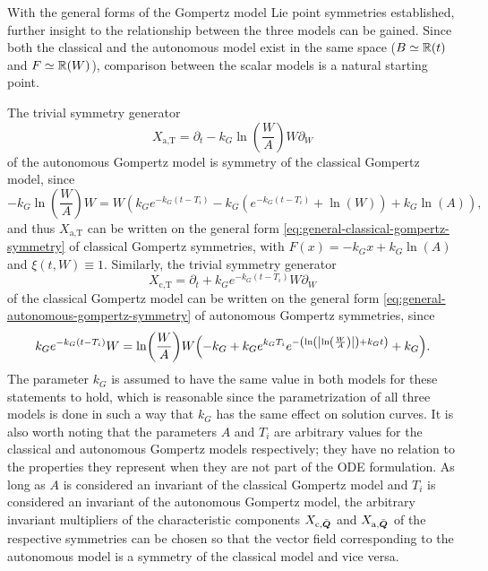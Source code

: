 With the general forms of the Gompertz model Lie point symmetries established, further insight to the relationship between the three models can be gained.
Since both the classical and the autonomous model exist in the same space (\(B \simeq \mathbb{R}(t)\) and \(F \simeq \mathbb{R}(W)\)), comparison between the scalar models is a natural starting point.

The trivial symmetry generator
\begin{equation*}
  X_{\text{a},\text{T}} = \partial_t - k_G \ln\left(\frac{W}{A}\right) W \partial_W
\end{equation*}
of the autonomous Gompertz model is symmetry of the classical Gompertz model, since
\begin{equation*}
  -k_G \ln\left(\frac{W}{A}\right) W = W \left(k_G e^{-k_G (t - T_i)} - k_G \left(e^{-k_G (t - T_i)} + \ln\left(W\right)\right) + k_G \ln\left(A\right)\right),
\end{equation*}
and thus \(X_{\text{a},\text{T}}\) can be written on the general form \cref{eq:general-classical-gompertz-symmetry} of classical Gompertz symmetries, with \(F(x) = -k_G x + k_G \ln\left(A\right)\) and \(\xi(t, W) \equiv 1\).
Similarly, the trivial symmetry generator
\begin{equation*}
  X_{\text{c},\text{T}} = \partial_t + k_G e^{-k_G (t - T_i)} W \partial_W
\end{equation*}
of the classical Gompertz model can be written on the general form \cref{eq:general-autonomous-gompertz-symmetry} of autonomous Gompertz symmetries, since
\begin{equation*}
  k_G e^{-k_G (t - T_i)} W = \ln\left(\frac{W}{A}\right) W \left(-k_G + k_G e^{k_G T_i} e^{-\left(\ln\left(\abs{\ln\left(\frac{W}{A}\right)}\right) + k_G t\right)} + k_G\right).
\end{equation*}
The parameter \(k_G\) is assumed to have the same value in both models for these statements to hold, which is reasonable since the parametrization of all three models is done in such a way that \(k_G\) has the same effect on solution curves.
It is also worth noting that the parameters \(A\) and \(T_i\) are arbitrary values for the classical and autonomous Gompertz models respectively; they have no relation to the properties they represent when they are not part of the ODE formulation.
As long as \(A\) is considered an invariant of the classical Gompertz model and \(T_i\) is considered an invariant of the autonomous Gompertz model, the arbitrary invariant multipliers of the characteristic components \(X_{\text{c}, \bar{\boldsymbol{Q}}}\) and \(X_{\text{a}, \bar{\boldsymbol{Q}}}\) of the respective symmetries can be chosen so that the vector field corresponding to the autonomous model is a symmetry of the classical model and vice versa.

